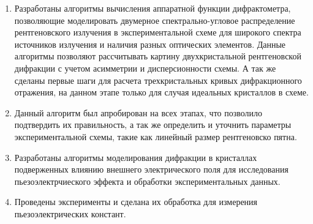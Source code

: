 \begin{enumerate}
\item Разработаны алгоритмы вычисления аппаратной функции дифрактометра, позволяющие моделировать
двумерное спектрально-угловое распределение рентгеновского излучения в экспериментальной схеме
для широкого спектра источников излучения и наличия разных оптических элементов.
Данные алгоритмы позволяют рассчитывать картину двухкристальной рентгеновской дифракции с учетом
асимметрии и дисперсионности схемы. А так же сделаны первые шаги для расчета трехкристальных кривых дифракционного
отражения, на данном этапе только для случая идеальных кристаллов в схеме.

\item Данный алгоритм был апробирован на всех этапах, что позволило подтвердить их правильность,
а так же определить и уточнить параметры экспериментальной схемы, такие как линейный размер рентгеновско пятна.

\item  Разработаны алгоритмы моделирования дифракции в кристаллах подверженных
влиянию внешнего электрического поля для исследования пьезоэлектрчиеского эффекта и обработки
экспериментальных данных.

\item Проведены эксперименты и сделана их обработка для измерения пьезоэлектрических констант.
\end{enumerate}
